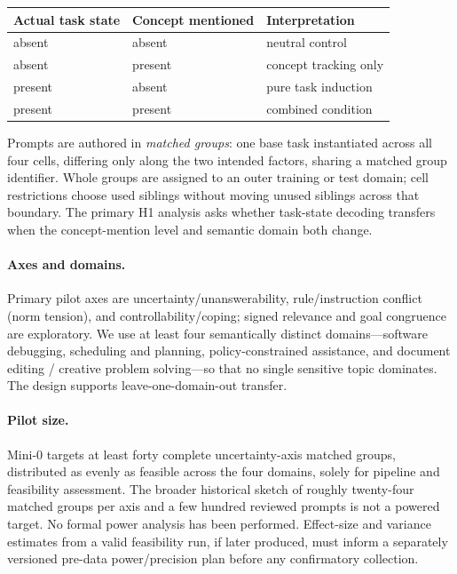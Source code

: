 \documentclass[11pt]{article}
\begin{document}
\begin{center}
\begin{tabular}{lll}
\toprule
Actual task state & Concept mentioned & Interpretation \\
\midrule
absent  & absent  & neutral control \\
absent  & present & concept tracking only \\
present & absent  & pure task induction \\
present & present & combined condition \\
\bottomrule
\end{tabular}
\end{center}

Prompts are authored in \emph{matched groups}: one base task instantiated across
all four cells, differing only along the two intended factors, sharing a matched
group identifier. Whole groups are assigned to an outer training or test domain;
cell restrictions choose used siblings without moving unused siblings across that
boundary. The primary H1 analysis asks whether task-state decoding transfers when
the concept-mention level and semantic domain both change.

\paragraph{Axes and domains.}
Primary pilot axes are uncertainty/unanswerability, rule/instruction conflict (norm
tension), and controllability/coping; signed relevance and goal congruence are
exploratory. We use at least four semantically distinct domains---software
debugging, scheduling and planning, policy-constrained assistance, and document
editing / creative problem solving---so that no single sensitive topic dominates.
The design supports leave-one-domain-out transfer.

\paragraph{Pilot size.}
Mini-0 targets at least forty complete uncertainty-axis matched groups, distributed
as evenly as feasible across the four domains, solely for pipeline and feasibility
assessment. The broader historical sketch of roughly twenty-four matched groups
per axis and a few hundred reviewed prompts is not a powered target. No formal
power analysis has been performed. Effect-size and variance estimates from a valid
feasibility run, if later produced, must inform a separately versioned pre-data
power/precision plan before any confirmatory collection.
\end{document}
